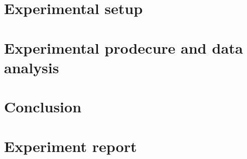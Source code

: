 \documentclass[
    oneside, 
    footinclude=off, 
    captions=tableheading, 
    DIV=12;usenames,
    dvipsnames
]{scrartcl}
\begin{document}
\newpage
\section{Experimental setup}
    

\newpage
\section{Experimental prodecure and data analysis}
    

\newpage
\section{Conclusion}
    


\newpage
    
\newpage
    \listoffigures
    \listoftables


%     
%     

\newpage
    \section{Experiment report}
        
\end{document}
